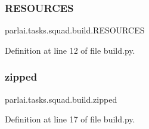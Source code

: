 \subsubsection{\texorpdfstring{R\+E\+S\+O\+U\+R\+C\+ES}{RESOURCES}}
{\footnotesize\ttfamily parlai.\+tasks.\+squad.\+build.\+R\+E\+S\+O\+U\+R\+C\+ES}



Definition at line 12 of file build.\+py.

\mbox{\label{namespaceparlai_1_1tasks_1_1squad_1_1build_af9fc1ae55cc97a4dd4ac6d92659e0389}} 
\subsubsection{\texorpdfstring{zipped}{zipped}}
{\footnotesize\ttfamily parlai.\+tasks.\+squad.\+build.\+zipped}



Definition at line 17 of file build.\+py.

